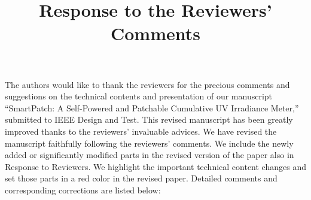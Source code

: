 \documentclass[onecolumn]{IEEEconf}
\title{Response to the Reviewers' Comments}
\begin{document}
\maketitle

The authors would like to thank the reviewers for the precious comments and suggestions on the technical contents and presentation of our manuscript ``SmartPatch: A Self-Powered and Patchable Cumulative UV Irradiance Meter,'' submitted to IEEE Design and Test. This revised manuscript has been greatly improved thanks to the reviewers' invaluable advices. We have revised the manuscript faithfully following the reviewers' comments. We include the newly added or significantly modified parts in the revised version of the paper also in Response to Reviewers. We highlight the important technical content changes and set those parts in a red color in the revised paper. Detailed comments and corresponding corrections are listed below:\\
\end{document}
